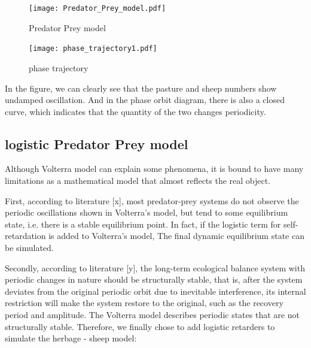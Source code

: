 \documentclass[12pt]{article}  %
\begin{document}
\begin{figure}[htbp]
	\centering
	\begin{minipage}[t]{0.45\textwidth}
		\centering
		\texttt{[image: Predator\_Prey\_model.pdf]}
		\caption{Predator Prey model}
	\end{minipage}
	\begin{minipage}[t]{0.45\textwidth}
		\centering
		\texttt{[image: phase\_trajectory1.pdf]}
		\caption{phase trajectory}
	\end{minipage}
\end{figure}

In the figure, we can clearly see that the pasture and sheep numbers show undamped oscillation. And in the phase orbit diagram, there is also a closed curve, which indicates that the quantity of the two changes periodicity.

\subsection{logistic Predator Prey model}
Although Volterra model can explain some phenomena, it is bound to have many limitations as a mathematical model that almost reflects the real object.

First, according to literature [x], most predator-prey systems do not observe the periodic oscillations shown in Volterra's model, but tend to some equilibrium state, i.e. there is a stable equilibrium point. In fact, if the logistic term for self-retardation is added to Volterra's model, The final dynamic equilibrium state can be simulated. 

Secondly, according to literature [y], the long-term ecological balance system with periodic changes in nature should be structurally stable, that is, after the system deviates from the original periodic orbit due to inevitable interference, its internal restriction will make the system restore to the original, such as the recovery period and amplitude. The Volterra model describes periodic states that are not structurally stable. Therefore, we finally chose to add logistic retarders to simulate the herbage - sheep model:
\end{document}
